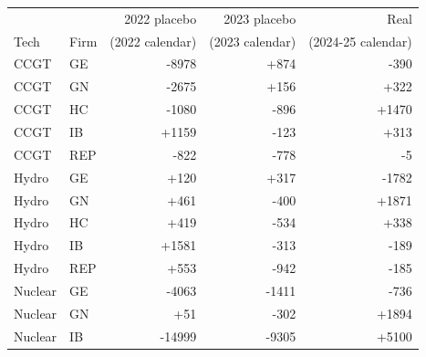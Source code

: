 \begin{tabular}{l l r r r}
\toprule
 & & 2022 placebo & 2023 placebo & Real \\
Tech & Firm & (2022 calendar) & (2023 calendar) & (2024-25 calendar) \\
\midrule
CCGT & GE & -8978 & +874 & -390 \\
CCGT & GN & -2675 & +156 & +322 \\
CCGT & HC & -1080 & -896 & +1470 \\
CCGT & IB & +1159 & -123 & +313 \\
CCGT & REP & -822 & -778 & -5 \\
Hydro & GE & +120 & +317 & -1782 \\
Hydro & GN & +461 & -400 & +1871 \\
Hydro & HC & +419 & -534 & +338 \\
Hydro & IB & +1581 & -313 & -189 \\
Hydro & REP & +553 & -942 & -185 \\
Nuclear & GE & -4063 & -1411 & -736 \\
Nuclear & GN & +51 & -302 & +1894 \\
Nuclear & IB & -14999 & -9305 & +5100 \\
\bottomrule
\end{tabular}